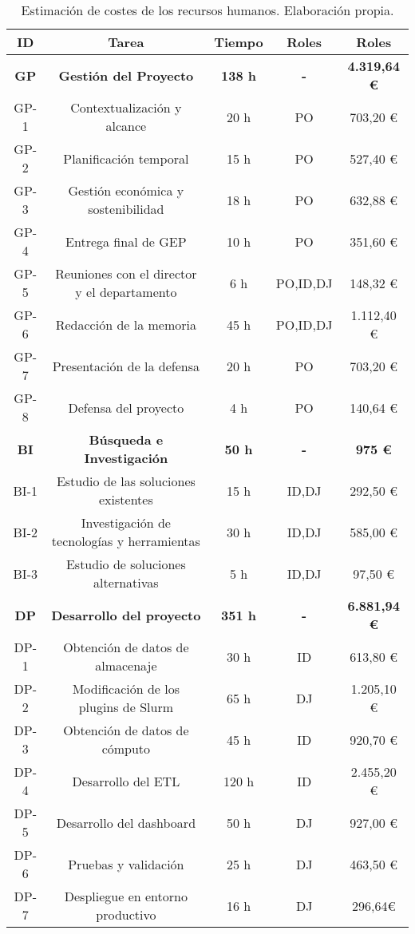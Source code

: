 \begin{table}[H]
    \centering
    \begin{tabular}{|c|c|c|c|c|}
        \hline
        \textbf{ID} & \textbf{Tarea} & \textbf{Tiempo} & \textbf{Roles} & \textbf{Roles}\\
        \hline
        \textbf{GP} & \textbf{Gestión del Proyecto} & \textbf{138 h} & \textbf{-}  & \textbf{4.319,64 €} \\
        \hline
        GP-1 & Contextualización y alcance & 20 h &  PO  & 703,20 € \\
        GP-2 & Planificación temporal & 15 h &  PO  & 527,40 € \\
        GP-3 & Gestión económica y sostenibilidad & 18 h &  PO  & 632,88 € \\
        GP-4 & Entrega final de GEP & 10 h &  PO  & 351,60 € \\
        GP-5 & Reuniones con el director y el departamento & 6 h &  PO,ID,DJ  & 148,32 € \\
        GP-6 & Redacción de la memoria & 45 h & PO,ID,DJ & 1.112,40 € \\
        GP-7 & Presentación de la defensa & 20 h &  PO  & 703,20 € \\
        GP-8 & Defensa del proyecto & 4 h &  PO & 140,64 € \\
        \hline
        \textbf{BI} & \textbf{Búsqueda e Investigación} & \textbf{50 h} & \textbf{-} & \textbf{975 €} \\
        \hline
        BI-1 & Estudio de las soluciones existentes & 15 h & ID,DJ & 292,50 € \\
        BI-2 & Investigación de tecnologías y herramientas & 30 h & ID,DJ & 585,00 € \\
        BI-3 & Estudio de soluciones alternativas & 5 h & ID,DJ & 97,50 € \\
        \hline
        \textbf{DP} & \textbf{Desarrollo del proyecto} & \textbf{351 h} & \textbf{-} & \textbf{6.881,94 €} \\
        \hline
        DP-1 & Obtención de datos de almacenaje & 30 h & ID & 613,80 € \\
        DP-2 & Modificación de los plugins de Slurm & 65 h & DJ & 1.205,10 € \\
        DP-3 & Obtención de datos de cómputo & 45 h & ID & 920,70 € \\
        DP-4 & Desarrollo del ETL & 120 h & ID & 2.455,20 € \\
        DP-5 & Desarrollo del dashboard & 50 h & DJ & 927,00 € \\
        DP-6 & Pruebas y validación & 25 h & DJ & 463,50 € \\
        DP-7 & Despliegue en entorno productivo & 16 h & DJ & 296,64€ \\
        \hline
    \end{tabular}
    \caption{Estimación de costes de los recursos humanos. Elaboración propia.}
    \label{tab:estimaciones_humanos}
\end{table}
